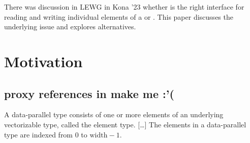 \newcommand\wgTitle{Replace simd operator[] with getter and setter functions --- or not}
\newcommand\wgName{Matthias Kretz <m.kretz@gsi.de>}
\newcommand\wgDocumentNumber{D3275R1}
\newcommand\wgGroup{LEWG}
\newcommand\wgTarget{\CC{}26}
\newcommand\wgAcknowledgements{Daniel Towner and Ruslan Arutyunyan contributed
to this paper via discussions / reviews. Thanks also to Jeff Garland for reviewing.}

\usepackage{mymacros}
\usepackage{wg21}
\setcounter{tocdepth}{2} %
\hypersetup{bookmarksdepth=5}
\usepackage{changelog}
\usepackage{underscore}
\usepackage{multirow}



\newcommand\simd[1][]{\type{ba\-sic\_simd#1}\xspace}
\newcommand\simdT{\type{ba\-sic\_simd\MayBreak<\MayBreak{}T>}\xspace}
\newcommand\valuetype{\type{val\-ue\_type}\xspace}
\newcommand\referencetype{\type{ref\-er\-ence}\xspace}
\newcommand\mask[1][]{\type{ba\-sic\_simd\_mask#1}\xspace}
\newcommand\maskT{\type{ba\-sic\_simd\_mask\MayBreak<\MayBreak{}T>}\xspace}
\newcommand\wglink[1]{\href{https://wg21.link/#1}{#1}}

\newcommand\nativeabi{\UNSP{native-abi}}
\newcommand\deducet{\UNSP{deduce-t}}
\newcommand\simdsizev{\UNSP{simd-size-v}}
\newcommand\simdsizetype{\UNSP{simd-size-type}}
\newcommand\simdselect{\UNSP{simd-select-impl}}
\newcommand\maskelementsize{\UNSP{mask-element-size}}
\newcommand\integerfrom{\UNSP{integer-from}}
\newcommand\constexprwrapperlike{\UNSP{constexpr-wrapper-like}}

\renewcommand{\lst}[1]{Listing~\ref{#1}}
\renewcommand{\sect}[1]{Section~\ref{#1}}
\renewcommand{\ttref}[1]{Tony~Table~\ref{#1}}
\renewcommand{\tabref}[1]{Table~\ref{#1}}


\begin{wgTitlepage}
  There was discussion in LEWG in Kona '23 whether  is the
  right interface for reading and writing individual elements of a \simd or
  \mask.
  This paper discusses the underlying issue and explores alternatives.
\end{wgTitlepage}

\pagestyle{scrheadings}




\section{Motivation}
\subsection{proxy references in \CC{} make me :'(}
\begin{wgText}
  A data-parallel type consists of one or more elements of an underlying
  vectorizable type, called the element type.
  [\ldots]
  The elements in a data-parallel type are indexed from 0 to $\mathrm{width} - 1$.
\end{wgText}

